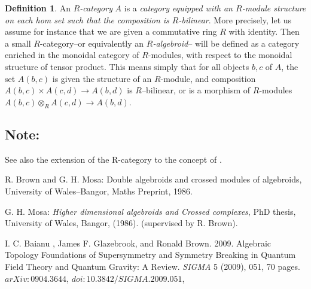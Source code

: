\documentclass[12pt]{article}
\theoremstyle{plain}
\theoremstyle{definition}
\newtheorem{definition}{Definition}[section]
\numberwithin{equation}{section}
\newcommand{\lra}{{\longrightarrow}}
\begin{document}
\begin{definition}

An \textit{$R$-category }$A$ is a \emph{category equipped with an $R$-module structure on each \textit{hom} set such that the composition is $R$-bilinear}. More precisely, let us assume for instance that we are given a commutative ring $R$ with identity. Then a small $R$-category--or equivalently an \emph{$R$-algebroid}-- will be defined as a category enriched in the monoidal category of $R$-modules, with respect to the monoidal structure of tensor product. This means simply that for all objects $b,c$ of $A$, the set $A(b,c)$ is given the structure of an $R$-module, and composition $A(b,c) \times A(c,d) \lra A(b,d)$ is $R$--bilinear, or is a morphism of $R$-modules 
$A(b,c) \otimes_R A(c,d) \lra A(b,d)$.
\end{definition}

\subsection{Note:}
See also the extension of the R-category to the concept of . 
\begin{thebibliography}{9}

R. Brown and G. H. Mosa: Double algebroids and crossed modules of algebroids, University of Wales--Bangor, Maths Preprint, 1986.

G. H. Mosa: \emph{Higher dimensional algebroids and Crossed
complexes}, PhD thesis, University of Wales, Bangor, (1986). (supervised by R. Brown).

I. C. Baianu , James F. Glazebrook, and Ronald Brown. 2009. Algebraic Topology Foundations of Supersymmetry and Symmetry Breaking in Quantum Field Theory and Quantum Gravity: A Review. \emph{SIGMA} 5 (2009), 051, 70 pages. $arXiv:0904.3644$, $doi:10.3842/SIGMA.2009.051$,

\end{thebibliography}
\end{document}
